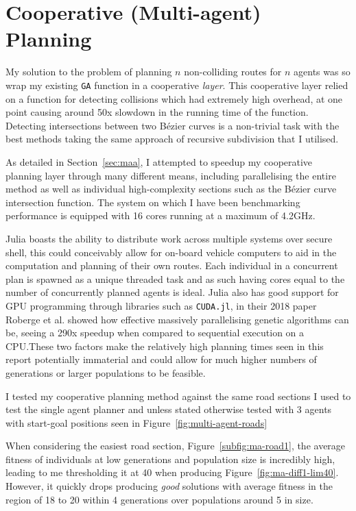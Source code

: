 \section{Cooperative (Multi-agent) Planning}
\label{subsec:eval-cooperativeplanning}

My solution to the problem of planning $n$ non-colliding routes for $n$ agents was so wrap my existing \texttt{GA} function in a cooperative \textit{layer}. This cooperative layer relied on a function for detecting collisions which had extremely high overhead, at one point causing around 50x slowdown in the running time of the function. Detecting intersections between two Bézier curves is a non-trivial task with the best methods taking the same approach of recursive subdivision that I utilised.

As detailed in Section~\ref{sec:maa}, I attempted to speedup my cooperative planning layer through many different means, including parallelising the entire method as well as individual high-complexity sections such as the Bézier curve intersection function. The system on which I have been benchmarking performance is equipped with 16 cores running at a maximum of 4.2GHz.

Julia boasts the ability to distribute work across multiple systems over secure shell, this could conceivably allow for on-board vehicle computers to aid in the computation and planning of their own routes. Each individual in a concurrent plan is spawned as a unique threaded task and as such having cores equal to the number of concurrently planned agents is ideal. Julia also has good support for GPU programming through libraries such as \texttt{CUDA.jl}\cite{besard2018juliagpu}, in their 2018 paper Roberge et al.\cite{robergeFastGeneticAlgorithm2018} showed how effective massively parallelising genetic algorithms can be, seeing a 290x speedup when compared to sequential execution on a CPU.\@ These two factors make the relatively high planning times seen in this report potentially immaterial and could allow for much higher numbers of generations or larger populations to be feasible.

I tested my cooperative planning method against the same road sections I used to test the single agent planner and unless stated otherwise tested with 3 agents with start-goal positions seen in Figure~\ref{fig:multi-agent-roads}

When considering the easiest road section, Figure~\ref{subfig:ma-road1}, the average fitness of individuals at low generations and population size is incredibly high, leading to me thresholding it at 40 when producing Figure~\ref{fig:ma-diff1-lim40}. However, it quickly drops producing \textit{good} solutions with average fitness in the region of 18 to 20 within 4 generations over populations around 5 in size.

